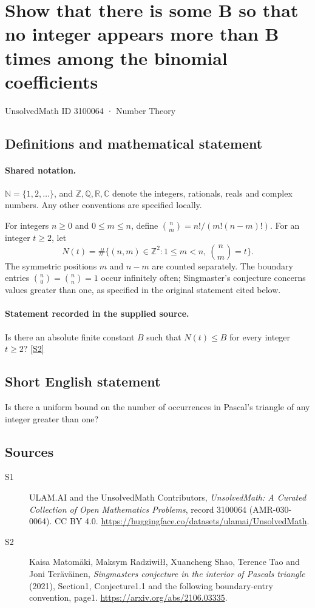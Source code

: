 \documentclass[11pt]{article}
\newcommand{\sref}[2]{\hyperlink{source:#1:#2}{[S#2]}}
\begin{document}
\setcounter{section}{3100063}
\section{Show that there is some B so that no integer appears more than B times among the binomial coefficients}\label{3100064}
{\small\sffamily UnsolvedMath ID 3100064 · Number Theory}
\subsection{Definitions and mathematical statement}

\paragraph{Shared notation.}$\mathbb N=\{1,2,\ldots\}$, and $\mathbb Z,\mathbb Q,\mathbb R,\mathbb C$ denote the integers, rationals, reals and complex numbers. Any other conventions are specified locally.


For integers $n\ge0$ and $0\le m\le n$, define $\binom nm=n!/(m!(n-m)!)$. For an integer $t\ge2$, let
\[N(t)=\#\{(n,m)\in\mathbb Z^2:1\le m<n,\ \binom nm=t\}.\]
The symmetric positions $m$ and $n-m$ are counted separately. The boundary entries $\binom n0=\binom nn=1$ occur infinitely often; Singmaster's conjecture concerns values greater than one, as specified in the original statement cited below.

\paragraph{Statement recorded in the supplied source.}
Is there an absolute finite constant $B$ such that $N(t)\le B$ for every integer $t\ge2$? \sref{3100064}{2}

\subsection{Short English statement}
Is there a uniform bound on the number of occurrences in Pascal’s triangle of any integer greater than one?
\subsection{Sources}
\begin{description}
\item[\hypertarget{source:3100064:1}{S1}] ULAM.AI and the UnsolvedMath Contributors, \emph{UnsolvedMath: A Curated Collection of Open Mathematics Problems}, record 3100064 (AMR-030-0064). CC BY 4.0. \url{https://huggingface.co/datasets/ulamai/UnsolvedMath}.
\item[\hypertarget{source:3100064:2}{S2}] Kaisa Matomäki, Maksym Radziwiłł, Xuancheng Shao, Terence Tao and Joni Teräväinen, \emph{Singmaster\textquotesingle s conjecture in the interior of Pascal\textquotesingle s triangle} (2021), Section1, Conjecture1.1 and the following boundary-entry convention, page1. \url{https://arxiv.org/abs/2106.03335}.
\end{description}
\label{end:3100064}
\end{document}
